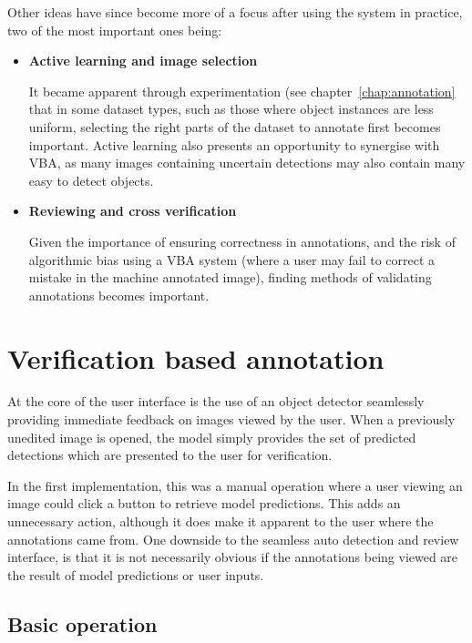 Other ideas have since become more of a focus after using the system in practice, two of the most important ones being:

\begin{itemize}

\item {\bf Active learning and image selection} \par

It became apparent through experimentation (see chapter~\ref{chap:annotation} that in some dataset types, such as those where object instances are less uniform, selecting the right parts of the dataset to annotate first becomes important. Active learning also presents an opportunity to synergise with \gls{VBA}, as many images containing uncertain detections may also contain many easy to detect objects.

\item {\bf Reviewing and cross verification} \par

Given the importance of ensuring correctness in annotations, and the risk of algorithmic bias using a \gls{VBA} system (where a user may fail to correct a mistake in the machine annotated image), finding methods of validating annotations becomes important. 

\end{itemize}


\section {Verification based annotation}

At the core of the user interface is the use of an object detector seamlessly providing immediate feedback on images viewed by the user. When a previously unedited image is opened, the model simply provides the set of predicted detections which are presented to the user for verification. 

In the first implementation, this was a manual operation where a user viewing an image could click a button to retrieve model predictions. This adds an unnecessary action, although it does make it apparent to the user where the annotations came from. One downside to the seamless auto detection and review interface, is that it is not necessarily obvious if the annotations being viewed are the result of model predictions or user inputs.

\subsection{Basic operation}


